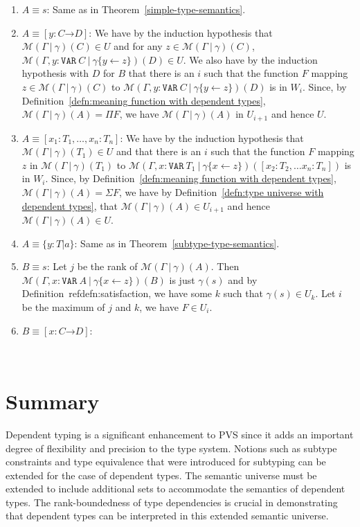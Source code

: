 \documentclass [12pt,twoside]{cslreport}
\newcommand{\thmbox}
   {{\ \hfill\hbox{%
      \vrule width1.0ex height1.0ex
   }\parfillskip 0pt }}
\newenvironment{proof}{{\bf Proof. }}{\thmbox}
\newcommand{\aro}{\mathord\rightarrow} %
\newcommand{\funtype}[2]{[#1 \aro #2]}
\newcommand{\tupletype}[1]{[#1]}
\newcommand{\Mgamma}[1]{{\mathcal M}(\Gamma\vbar\gamma)(#1)}
\newcommand{\ttvar}{\mathtt{VAR}}
\newcommand{\vbar}{\ |\ }
\begin{document}
{\begin{proof}
\begin{enumerate}
\item $A\equiv s$: Same as in Theorem~\ref{simple-type-semantics}\@.
%
\item $A\equiv \funtype{y : C}{D}$: We have by the induction hypothesis
that $\Mgamma{C}\in U$ and for any $z\in \Mgamma{C}$, $\mathcal{M}(\Gamma,
y:\ttvar~C\vbar \gamma\{y\gets z\})(D) \in U$\@.  We also have by the
induction hypothesis with $D$ for $B$ that there is an $i$ such that
the function $F$ mapping $z\in \Mgamma{C}$ to $\mathcal{M}(\Gamma,
y:\ttvar~C\vbar \gamma\{y\gets z\})(D)$ is in $W_i$\@.
Since, by Definition~\ref{defn:meaning function with dependent types},
$\Mgamma{A} = \Pi{F}$, we have $\Mgamma{A}$ in $U_{i+1}$ and hence $U$\@.
%
\item $A\equiv \tupletype{x_1 : T_1,\ldots, x_n : T_n}$:  We have by the
induction hypothesis that $\Mgamma{T_1}\in U$ and that there is an $i$
such that 
the function $F$ mapping $z$ in $\Mgamma{T_1}$ to
$\mathcal{M}(\Gamma, x: \ttvar~T_1\vbar \gamma\{x\gets z\})(\tupletype{x_2:
T_2, \ldots x_n: T_n})$  is in $W_i$\@.  Since, by
Definition~\ref{defn:meaning function with dependent types},
$\Mgamma{A} = \Sigma{F}$,
we have by Definition~\ref{defn:type universe with dependent types},
that $\Mgamma{A}\in U_{i+1}$ and hence $\Mgamma{A}\in U$\@.
%
\item $A\equiv \{y : T | a\}$: Same as in
Theorem~\ref{subtype-type-semantics}\@.
%
\item $B \equiv s$:  Let $j$ be the rank of $\Mgamma{A}$\@.  
Then $\mathcal{M}(\Gamma, x : \ttvar~A\vbar \gamma\{x\gets
z\})(B)$ is just $\gamma(s)$ and by Definition~ref{defn:satisfaction},
we have some $k$ such that $\gamma(s)\in U_k$\@.  Let $i$ be the maximum
of $j$ and $k$, we have $F\in U_i$\@.
%
\item $B\equiv \funtype{x: C}{D}$:  
\end{enumerate}
\end{proof}
}

\section{Summary}

Dependent typing is a significant enhancement to PVS since it adds
an important degree of flexibility and precision to the type system.
Notions  such as subtype constraints and type equivalence
that were introduced for subtyping can be extended for the case of
dependent types.  The semantic universe must be extended to include
additional sets to accommodate the semantics of dependent types.
The rank-boundedness of type dependencies is crucial in demonstrating that
dependent types can be interpreted in this extended semantic universe.
  
\end{document}

